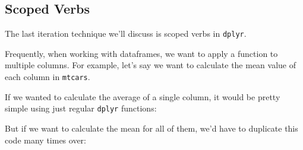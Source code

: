 \documentclass[]{book}
\newenvironment{Shaded}{\begin{snugshade}}{\end{snugshade}}
\newcommand{\CommentTok}[1]{\textcolor[rgb]{0.56,0.35,0.01}{\textit{#1}}}
\newcommand{\DataTypeTok}[1]{\textcolor[rgb]{0.13,0.29,0.53}{#1}}
\newcommand{\KeywordTok}[1]{\textcolor[rgb]{0.13,0.29,0.53}{\textbf{#1}}}
\newcommand{\NormalTok}[1]{#1}
\newcommand{\OperatorTok}[1]{\textcolor[rgb]{0.81,0.36,0.00}{\textbf{#1}}}
\newcommand{\StringTok}[1]{\textcolor[rgb]{0.31,0.60,0.02}{#1}}
\begin{document}
\hypertarget{scoped-verbs}{%
\subsection{Scoped Verbs}\label{scoped-verbs}}

The last iteration technique we'll discuss is scoped verbs in \texttt{dplyr}.

Frequently, when working with dataframes, we want to apply a function to multiple columns. For example, let's say we want to calculate the mean value of each column in \texttt{mtcars}.

If we wanted to calculate the average of a single column, it would be pretty simple using just regular \texttt{dplyr} functions:

\begin{Shaded}
\end{Shaded}

But if we want to calculate the mean for all of them, we'd have to duplicate this code many times over:

\begin{Shaded}
\end{Shaded}
\end{document}
